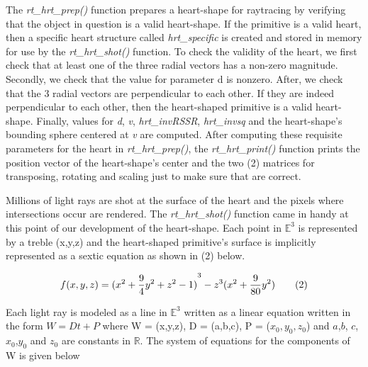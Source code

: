 \hspace{30} The   \textit{rt\_hrt\_prep()}   function   prepares   a   heart-­shape   for   ray­tracing   by  
verifying   that   the   object   in   question   is   a   valid   heart-­shape.   If   the   primitive   is   a  
valid   heart,   then   a   specific   heart   structure   called   \textit{hrt\_specific}   is   created   and  
stored   in   memory   for   use   by   the   \textit{rt\_hrt\_shot()}   function.   To   check   the   validity   of  
the   heart,   we   first   check   that   at least   one   of   the   three   radial   vectors   has   a  
non-zero   magnitude.   Secondly,   we   check   that   the   value   for   parameter   d   is  
non­zero.   After,   we   check   that   the   3   radial   vectors   are  
perpendicular   to   each other.   If   they   are   indeed   perpendicular   to   each   other,   then  
the   heart­-shaped   primitive   is   a   valid   heart-shape.   Finally,  values   for   \textit{d},   \textit{v},  
\textit{hrt\_invRSSR},   \textit{hrt\_invsq}   and   the   heart-shape's   bounding   sphere   centered   at   \textit{v} are computed.   After  
computing   these   requisite   parameters   for   the   heart   in   \textit{rt\_hrt\_prep()},   the  
\textit{rt\_hrt\_print()}   function   prints   the   position   vector   of   the   heart-­shape's   center   and  
the   two   (2)   matrices   for   transposing,   rotating   and   scaling   just   to   make   sure   that  
are correct.

\hspace{30} Millions   of   light   rays   are   shot   at   the   surface   of   the   heart   and   the   pixels  
where   intersections   occur   are   rendered.   The   \textit{rt\_hrt\_shot()}   function   came   in  
handy   at   this   point   of   our   development   of   the   heart-­shape.   Each   point   in $ \mathbb{E}^3 $
   is   represented   by   a   treble   (x,y,z)   and   the heart-­shaped   primitive's   surface   is   implicitly   represented   as   a   sextic   equation as shown in (2) below.  

\begin{equation*}
\centering
  ­­­­­­­­­­­­­­f(x,y,z) = {(x^2 + \frac{9}{4}y^2 + z^2 - 1 )}^3 - z^3(x^2 + \frac{9}{80}y^2) \tag{2}
\end{equation*}

Each   light   ray   is   modeled   as   a   line   in   $ \mathbb{E}^3 $   written  
as   a   linear   equation   written   in   the   form   $W   =   Dt   +   P$   where   W   =   (x,y,z),   D   =   (a,b,c),  
P   =   ($x_0,y_0 ,z_0$) and $a$,$ b$, $ c$,$x_0$,$y_0$ and $z_0$ are constants in $ \mathbb{R} $.   The   system   of  
equations for the components of W is given below

